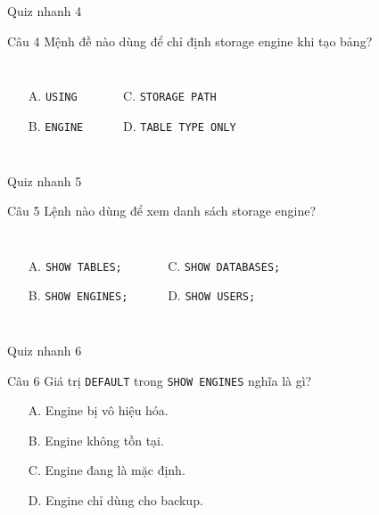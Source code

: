 \documentclass[aspectratio=169,11pt]{beamer}
\newcommand{\code}[1]{\texttt{#1}}
\newcommand{\smallitem}{\setlength{\itemsep}{2pt}}
\begin{document}
\begin{frame}{Quiz nhanh 4}
\begin{block}{Câu 4}
Mệnh đề nào dùng để chỉ định storage engine khi tạo bảng?
\end{block}
\vspace{0.2cm}
\begin{columns}[T,onlytextwidth]
\begin{itemize}\smallitem
  \item[A.] \code{USING}
  \item[B.] \code{ENGINE}
\end{itemize}
\begin{itemize}\smallitem
  \item[C.] \code{STORAGE PATH}
  \item[D.] \code{TABLE TYPE ONLY}
\end{itemize}
\end{columns}
\end{frame}

\begin{frame}{Quiz nhanh 5}
\begin{block}{Câu 5}
Lệnh nào dùng để xem danh sách storage engine?
\end{block}
\vspace{0.2cm}
\begin{columns}[T,onlytextwidth]
\begin{itemize}\smallitem
  \item[A.] \code{SHOW TABLES;}
  \item[B.] \code{SHOW ENGINES;}
\end{itemize}
\begin{itemize}\smallitem
  \item[C.] \code{SHOW DATABASES;}
  \item[D.] \code{SHOW USERS;}
\end{itemize}
\end{columns}
\end{frame}

\begin{frame}{Quiz nhanh 6}
\begin{block}{Câu 6}
Giá trị \code{DEFAULT} trong \code{SHOW ENGINES} nghĩa là gì?
\end{block}
\vspace{0.2cm}
\begin{itemize}\smallitem
  \item[A.] Engine bị vô hiệu hóa.
  \item[B.] Engine không tồn tại.
  \item[C.] Engine đang là mặc định.
  \item[D.] Engine chỉ dùng cho backup.
\end{itemize}
\end{frame}
\end{document}
